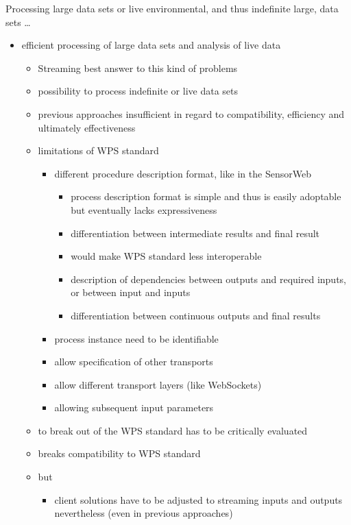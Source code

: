   Processing large data sets or live environmental, and thus indefinite large, data sets \dots
  \begin{itemize}
    \item efficient processing of large data sets and analysis of live data
    \begin{itemize}
      \item Streaming best answer to this kind of problems
      \item possibility to process indefinite or live data sets
      \item previous approaches insufficient in regard to compatibility, efficiency and ultimately effectiveness
      \item limitations of WPS standard
      \begin{itemize}
        \item different procedure description format, like in the SensorWeb
        \begin{itemize}
          \item process description format is simple and thus is easily adoptable but eventually lacks expressiveness
          \item differentiation between intermediate results and final result
          \item would make WPS standard less interoperable
          \item description of dependencies between outputs and required inputs, or between input and inputs
          \item differentiation between continuous outputs and final results
        \end{itemize}
        \item process instance need to be identifiable
        \item allow specification of other transports
        \item allow different transport layers (like WebSockets)
        \item allowing subsequent input parameters
      \end{itemize}
      \item to break out of the WPS standard has to be critically evaluated
      \item breaks compatibility to WPS standard
      \item but
      \begin{itemize}
        \item client solutions have to be adjusted to streaming inputs and outputs nevertheless (even in previous approaches)

\end{itemize}
\end{itemize}
\end{itemize}
